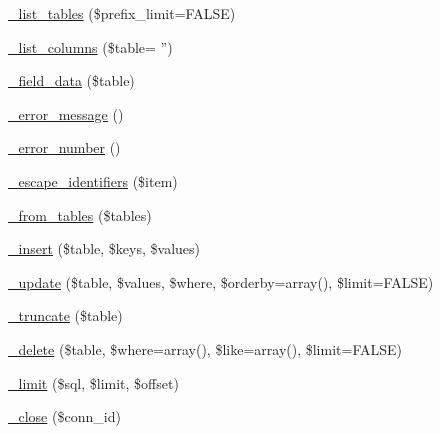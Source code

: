 \begin{DoxyCompactItemize}
\hyperlink{class_c_i___d_b__sqlite__driver_a435c0f3ce54fe7daa178baa8532ebd54}{\-\_\-list\-\_\-tables} (\$prefix\-\_\-limit=F\-A\-L\-S\-E)
\item 
\hyperlink{class_c_i___d_b__sqlite__driver_a2a81bb476a5c76fe6f763b0557c1e4c2}{\-\_\-list\-\_\-columns} (\$table= '')
\item 
\hyperlink{class_c_i___d_b__sqlite__driver_a95247d9671893adc3444cb184ad32ea1}{\-\_\-field\-\_\-data} (\$table)
\item 
\hyperlink{class_c_i___d_b__sqlite__driver_a4ca764fe1d6ad526f770f36b5f332bbb}{\-\_\-error\-\_\-message} ()
\item 
\hyperlink{class_c_i___d_b__sqlite__driver_a3e48199b3a946499b7e5fba0cdfa6b86}{\-\_\-error\-\_\-number} ()
\item 
\hyperlink{class_c_i___d_b__sqlite__driver_aeabfb3952399caa92a013621a98e3042}{\-\_\-escape\-\_\-identifiers} (\$item)
\item 
\hyperlink{class_c_i___d_b__sqlite__driver_a885a8b4372b5c099749cefa73767a744}{\-\_\-from\-\_\-tables} (\$tables)
\item 
\hyperlink{class_c_i___d_b__sqlite__driver_a69ee76b136052e0a8f06097fb388e53e}{\-\_\-insert} (\$table, \$keys, \$values)
\item 
\hyperlink{class_c_i___d_b__sqlite__driver_ae869ae2275175c5ffa22816a02099d96}{\-\_\-update} (\$table, \$values, \$where, \$orderby=array(), \$limit=F\-A\-L\-S\-E)
\item 
\hyperlink{class_c_i___d_b__sqlite__driver_aa029600528fc1ce660a23ff4b4667f95}{\-\_\-truncate} (\$table)
\item 
\hyperlink{class_c_i___d_b__sqlite__driver_ace3cbc04a520b7811fc956cdb9ae1c19}{\-\_\-delete} (\$table, \$where=array(), \$like=array(), \$limit=F\-A\-L\-S\-E)
\item 
\hyperlink{class_c_i___d_b__sqlite__driver_aeeaa5cd68dc6ace010c0b8aae89c2d15}{\-\_\-limit} (\$sql, \$limit, \$offset)
\item 
\hyperlink{class_c_i___d_b__sqlite__driver_a557bd6ddde8de1f7814e10b1120efd29}{\-\_\-close} (\$conn\-\_\-id)
\end{DoxyCompactItemize}
